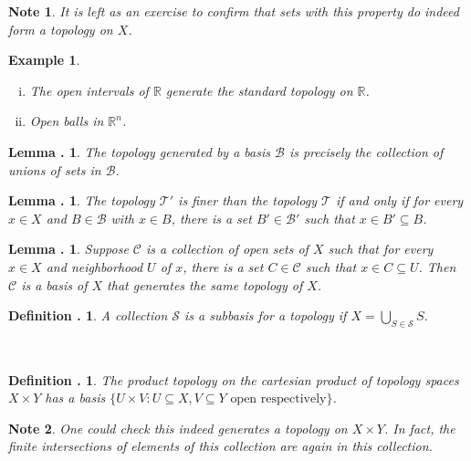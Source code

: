 \documentclass[twoside]{report}
\newcommand{\br}{\centering{ * \quad * \quad *} \\  }
\newcommand{\R}{\mathbb{R}}
\newcounter{Lecture}
\theoremstyle{myts}
\newcounter{c}[Lecture]
\newtheorem{dfn}[c]{Definition \arabic{Lecture}.}
\newtheorem{lma}[c]{Lemma \arabic{Lecture}.}
\newtheorem*{epl}{Example}
\newtheorem*{nte}{Note}
\newcounter{ex}[Lecture]
\begin{document}
\begin{nte}
  It is left as an exercise to confirm that sets with this property do indeed form a topology on $X$.
\end{nte}

\begin{epl}
\noindent
  \begin{enumerate}[(i)]
    \item The open intervals of $\R$ generate the standard topology on $\R$.
    \item Open balls in $\R^n$.
  \end{enumerate}
\end{epl}

\begin{lma}
  The topology generated by a basis $\mathcal{B}$ is precisely the collection of unions of sets in $\mathcal{B}$.
\end{lma}

\begin{lma}
  The topology \(\mathcal{T}'\) is finer than the topology \(\mathcal{T}\) if and only if for every \(x\in X\) and \(B\in\mathcal{B}\) with \(x\in B\), there is a set \(B'\in\mathcal{B}'\) such that \(x\in B'\subseteq B\).
\end{lma}

\begin{lma}
  Suppose \(\mathcal{C}\) is a collection of open sets of $X$ such that for every \(x\in X\) and neighborhood $U$ of $x$, there is a set \(C\in\mathcal{C}\) such that \(x\in C\subseteq U\). Then $\mathcal{C}$ is a basis of $X$ that generates the same topology of $X$.
\end{lma}

\begin{dfn}
  A collection $\mathcal{S}$ is a \emph{subbasis} for a topology if \(X = \bigcup_{S\in \mathcal{S}} S\).
\end{dfn}

\br

\begin{dfn}
  The \emph{product topology} on the cartesian product of topology spaces \(X\times Y\) has a basis \(\{U\times V : U\subseteq X, V\subseteq Y \textrm{ open respectively} \}\).
\end{dfn}

\begin{nte}
  One could check this indeed generates a topology on \(X\times Y\). In fact, the finite intersections of elements of this collection are again in this collection.
\end{nte}
\end{document}
